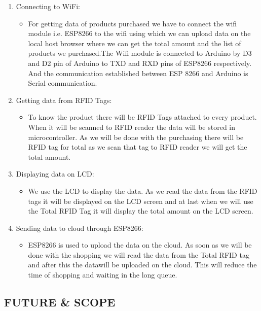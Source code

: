 \documentclass[12pt]{article}
\begin{document}
\begin{enumerate}
\item Connecting to WiFi: 
\begin{itemize}
\item For getting data of products purchased we have to connect the wifi module i.e. ESP8266 to the wifi using which we can upload data on the local host browser where we can get the total amount and the list of products we purchased.The Wifi module is connected to Arduino by D3 and D2 pin of Arduino to TXD and RXD pins of ESP8266 respectively. And the communication established between ESP 8266 and Arduino is Serial communication.
\end{itemize}
\item Getting data from RFID Tags:
\begin{itemize}
\item To know the product there will be RFID Tags attached to every product. When it will be scanned to RFID reader the data will be stored in microcontroller. As we will be done with the purchasing there will be RFID tag for total as we scan that tag to RFID reader we will get the total amount.
\end{itemize}
\item Displaying data on LCD:
\begin{itemize}
\item We use the LCD to display the data. As we read the data from the RFID tags it will be displayed on the LCD screen and at last when we will use the Total RFID Tag it will display the total amount on the LCD screen.
\end{itemize}
\item Sending data to cloud  through ESP8266:
\begin{itemize}
\item ESP8266 is used to upload the data on the cloud. As soon as we will be done with the shopping we will read the data from the Total RFID tag and after this the datawill be uploaded on the cloud. This will reduce the time of shopping and waiting in the long queue.
\end{itemize}
\end{enumerate}

\newpage
\begin{center}
\section{FUTURE \& SCOPE}
\end{center}
\end{document}
